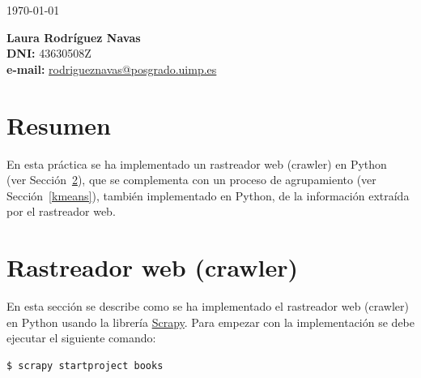 \documentclass{uimppracticas}
\begin{document}
	
\frontmatter


\begin{center}
\large \today
\end{center}

\vspace{40mm}

\begin{flushright}
 	{\bf Laura Rodríguez Navas}\\
 	\textbf{DNI:} 43630508Z\\
 	\textbf{e-mail:} \href{rodrigueznavas@posgrado.uimp.es}{rodrigueznavas@posgrado.uimp.es}
\end{flushright}

\newpage

\tableofcontents

\newpage

\mainmatter

\setlength\parskip{2.5ex}

\section{Resumen}

En esta práctica se ha implementado un rastreador web (crawler) en Python~\cite{GitHubRepo} (ver Sección~\ref{crawler}), que se complementa con un proceso de agrupamiento (ver Sección~\ref{kmeans}), también implementado en Python, de la información extraída por el rastreador web. 

\section{Rastreador web (crawler)}\label{crawler}

En esta sección se describe como se ha implementado el rastreador web (crawler) en Python usando la librería \href{https://scrapy.org/}{Scrapy}. Para empezar con la implementación se debe ejecutar el siguiente comando:

\begin{lstlisting}[language=bash]
$ scrapy startproject books
\end{lstlisting}
\end{document}
